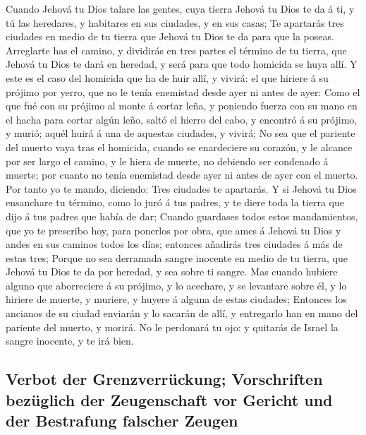  Cuando Jehová tu Dios talare las gentes, cuya tierra
Jehová tu Dios te da á ti, y tú las heredares, y habitares en sus
ciudades, y en sus casas;  Te apartarás tres ciudades en
medio de tu tierra que Jehová tu Dios te da para que la poseas.
 Arreglarte has el camino, y dividirás en tres partes el
término de tu tierra, que Jehová tu Dios te dará en heredad, y será para
que todo homicida se huya allí.  Y este es el caso del
homicida que ha de huir allí, y vivirá: el que hiriere á su prójimo por
yerro, que no le tenía enemistad desde ayer ni antes de ayer:
 Como el que fué con su prójimo al monte á cortar leña, y
poniendo fuerza con su mano en el hacha para cortar algún leño, saltó el
hierro del cabo, y encontró á su prójimo, y murió; aquél huirá á una de
aquestas ciudades, y vivirá;  No sea que el pariente del
muerto vaya tras el homicida, cuando se enardeciere su corazón, y le
alcance por ser largo el camino, y le hiera de muerte, no debiendo ser
condenado á muerte; por cuanto no tenía enemistad desde ayer ni antes de
ayer con el muerto.  Por tanto yo te mando, diciendo: Tres
ciudades te apartarás.  Y si Jehová tu Dios ensanchare tu
término, como lo juró á tus padres, y te diere toda la tierra que dijo á
tus padres que había de dar;  Cuando guardases todos estos
mandamientos, que yo te prescribo hoy, para ponerlos por obra, que ames
á Jehová tu Dios y andes en sus caminos todos los días; entonces
añadirás tres ciudades á más de estas tres;  Porque no
sea derramada sangre inocente en medio de tu tierra, que Jehová tu Dios
te da por heredad, y sea sobre ti sangre.  Mas cuando
hubiere alguno que aborreciere á su prójimo, y lo acechare, y se
levantare sobre él, y lo hiriere de muerte, y muriere, y huyere á alguna
de estas ciudades;  Entonces los ancianos de su ciudad
enviarán y lo sacarán de allí, y entregarlo han en mano del pariente del
muerto, y morirá.  No le perdonará tu ojo: y quitarás de
Israel la sangre inocente, y te irá bien.

\hypertarget{verbot-der-grenzverruxfcckung-vorschriften-bezuxfcglich-der-zeugenschaft-vor-gericht-und-der-bestrafung-falscher-zeugen}{%
\subsection{Verbot der Grenzverrückung; Vorschriften bezüglich der
Zeugenschaft vor Gericht und der Bestrafung falscher
Zeugen}\label{verbot-der-grenzverruxfcckung-vorschriften-bezuxfcglich-der-zeugenschaft-vor-gericht-und-der-bestrafung-falscher-zeugen}}

